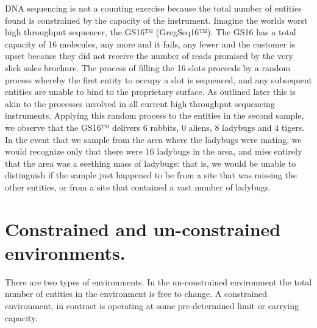 \documentclass[onecolumn]{book}
\theoremstyle{definition}
\theoremstyle{definition}
\theoremstyle{definition}
\theoremstyle{remark}
\begin{document}
DNA sequencing is not a counting exercise because the total number of
entities found is constrained by the capacity of the instrument. Imagine
the worlds worst high throughput sequencer, the GS16™ (GregSeq16™). The
GS16 has a total capacity of 16 molecules, any more and it fails, any
fewer and the customer is upset because they did not receive the number
of reads promised by the very slick sales brochure. The process of
filling the 16 slots proceeds by a random process whereby the first
entity to occupy a slot is sequenced, and any subsequent entities are
unable to bind to the proprietary surface. As outlined later this is
akin to the processes involved in all current high throughput sequencing
instruments. Applying this random process to the entities in the second
sample, we observe that the GS16™ delivers 6 rabbits, 0 aliens, 8
ladybugs and 4 tigers. In the event that we sample from the area where
the ladybugs were mating, we would recognize only that there were 16
ladybugs in the area, and miss entirely that the area was a seething
mass of ladybugs: that is, we would be unable to distinguish if the
sample just happened to be from a site that was missing the other
entities, or from a site that contained a vast number of ladybugs.

\hypertarget{constrained-and-un-constrained-environments.}{%
\section{Constrained and un-constrained
environments.}\label{constrained-and-un-constrained-environments.}}

There are two types of environments. In the un-constrained environment
the total number of entities in the environment is free to change. A
constrained environment, in contrast is operating at some pre-determined
limit or carrying capacity.
\end{document}
